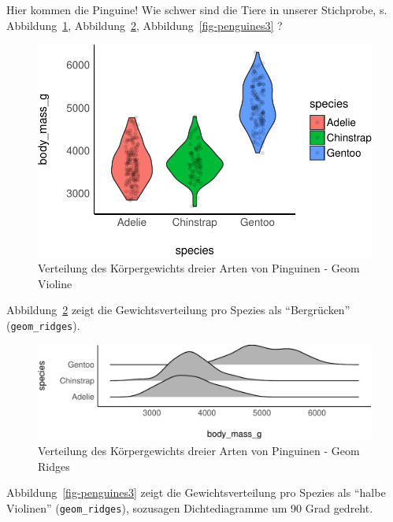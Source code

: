 \documentclass[
  a4paper,
  DIV=11]{scrreprt}
\theoremstyle{definition}
\theoremstyle{remark}
\begin{document}
Hier kommen die Pinguine! Wie schwer sind die Tiere in unserer
Stichprobe, s. Abbildung~\ref{fig-penguines1},
Abbildung~\ref{fig-penguines2}, Abbildung~\ref{fig-penguines3} ?

\begin{figure}

{\centering \includegraphics{./metrische-AV_files/figure-pdf/fig-penguines1-1.pdf}

}

\caption{\label{fig-penguines1}Verteilung des Körpergewichts dreier
Arten von Pinguinen - Geom Violine}

\end{figure}

Abbildung~\ref{fig-penguines2} zeigt die Gewichtsverteilung pro Spezies
als ``Bergrücken'' (\texttt{geom\_ridges}).

\begin{figure}

{\centering \includegraphics{./metrische-AV_files/figure-pdf/fig-penguines2-1.pdf}

}

\caption{\label{fig-penguines2}Verteilung des Körpergewichts dreier
Arten von Pinguinen - Geom Ridges}

\end{figure}

Abbildung~\ref{fig-penguines3} zeigt die Gewichtsverteilung pro Spezies
als ``halbe Violinen'' (\texttt{geom\_ridges}), sozusagen
Dichtediagramme um 90 Grad gedreht.
\end{document}
